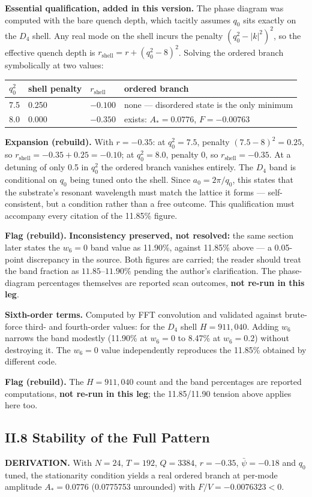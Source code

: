 \documentclass[11pt,a4paper]{article}
\newcommand{\expansion}[1]{\par\smallskip\noindent\textbf{Expansion (rebuild).} #1\par\smallskip}
\newcommand{\flagbox}[1]{\par\smallskip\noindent\textbf{Flag (rebuild).} #1\par\smallskip}
\begin{document}
\textbf{Essential qualification, added in this version.} The phase diagram was computed with the bare quench depth, which tacitly assumes $q_0$ sits exactly on the $D_4$ shell. Any real mode on the shell incurs the penalty $(q_0^2 - |k|^2)^2$, so the effective quench depth is $r_{\mathrm{shell}} = r + (q_0^2 - 8)^2$. Solving the ordered branch symbolically at two values:
\begin{center}
\begin{tabular}{llll}
\toprule
$q_0^2$ & shell penalty & $r_{\mathrm{shell}}$ & ordered branch \\
\midrule
7.5 & 0.250 & $-0.100$ & none --- disordered state is the only minimum \\
8.0 & 0.000 & $-0.350$ & exists: $A_* = 0.0776$, $F = -0.00763$ \\
\bottomrule
\end{tabular}
\end{center}
\expansion{With $r = -0.35$: at $q_0^2 = 7.5$, penalty $(7.5-8)^2 = 0.25$, so $r_{\mathrm{shell}} = -0.35 + 0.25 = -0.10$; at $q_0^2 = 8.0$, penalty $0$, so $r_{\mathrm{shell}} = -0.35$. At a detuning of only 0.5 in $q_0^2$ the ordered branch vanishes entirely. The $D_4$ band is conditional on $q_0$ being tuned onto the shell. Since $a_0 = 2\pi/q_0$, this states that the substrate's resonant wavelength must match the lattice it forms --- self-consistent, but a condition rather than a free outcome. This qualification must accompany every citation of the 11.85\% figure.}
\flagbox{\textbf{Inconsistency preserved, not resolved:} the same section later states the $w_6 = 0$ band value as 11.90\%, against 11.85\% above --- a 0.05-point discrepancy in the source. Both figures are carried; the reader should treat the band fraction as $11.85$--$11.90\%$ pending the author's clarification. The phase-diagram percentages themselves are reported scan outcomes, \textbf{not re-run in this leg}.}

\textbf{Sixth-order terms.} Computed by FFT convolution and validated against brute-force third- and fourth-order values: for the $D_4$ shell $H = 911{,}040$. Adding $w_6$ narrows the band modestly (11.90\% at $w_6 = 0$ to 8.47\% at $w_6 = 0.2$) without destroying it. The $w_6 = 0$ value independently reproduces the 11.85\% obtained by different code.
\flagbox{The $H = 911{,}040$ count and the band percentages are reported computations, \textbf{not re-run in this leg}; the 11.85/11.90 tension above applies here too.}

\subsection{II.8 Stability of the Full Pattern}
\textbf{DERIVATION.} With $N = 24$, $T = 192$, $Q = 3384$, $r = -0.35$, $\bar{\psi} = -0.18$ and $q_0$ tuned, the stationarity condition yields a real ordered branch at per-mode amplitude $A_* = 0.0776$ (0.0775753 unrounded) with $F/V = -0.0076323 < 0$.
\end{document}
